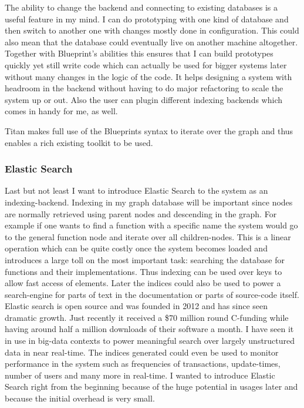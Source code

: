 \documentclass[11p]{scrartcl}
\begin{document}
The ability to change the backend and connecting to existing databases is a useful feature in my mind. I can do prototyping with one kind of database and then switch to another one with changes mostly done in configuration. This could also mean that the database  could eventually live on another machine altogether. Together with Blueprint's abilities this ensures that I can build prototypes quickly yet still write code which can actually be used for bigger systems later without many changes in the logic of the code. It helps designing a system with headroom in the backend without having to do major refactoring to scale the system up or out. Also the user can plugin different indexing backends which comes in handy for me, as well.

Titan makes full use of the Blueprints syntax to iterate over the graph and thus enables a rich existing toolkit to be used.

\subsubsection{Elastic Search}
Last but not least I want to introduce Elastic Search to the system as an indexing-backend. Indexing in my graph database will be important since nodes are normally retrieved using parent nodes and descending in the graph. For example if one wants to find a function with a specific name the system would go to the general function node and iterate over all children-nodes. This is a linear operation which can be quite costly once the system becomes loaded and introduces a large toll on the most important task: searching the database for functions and their implementations. Thus indexing can be used over keys to allow fast access of elements. Later the indices could also be used to power a search-engine for parts of text in the documentation or parts of source-code itself.
Elastic search is open source and was founded in 2012 and has since seen dramatic growth. Just recently it received a \$70 million round C-funding while having around half a million downloads of their software a month. \cite{link:esAbout} \cite{link:esTechCrunch} I have seen it in use in big-data contexts to power meaningful search over largely unstructured data in near real-time. The indices generated could even be used to monitor performance in the system such as frequencies of transactions, update-times, number of users and many more in real-time. I wanted to introduce Elastic Search right from the beginning because of the huge potential in usages later and because the initial overhead is very small.
\end{document}
